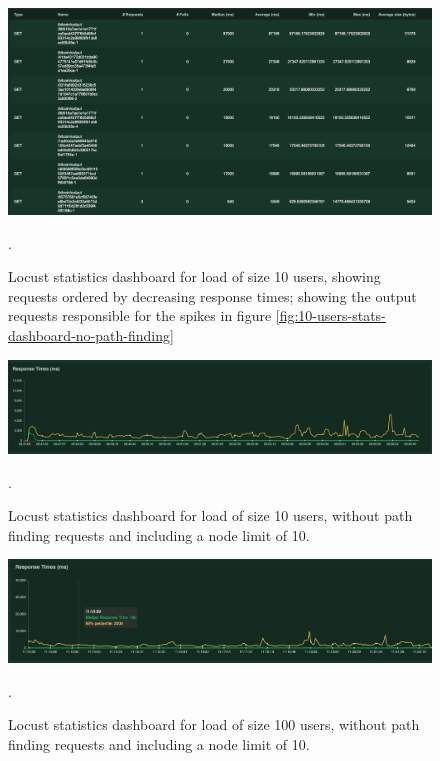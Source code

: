 \begin{appendices}
\begin{figure}[h!]
  \centering
  \includegraphics[width = 15cm]{./figures/10-users-no-path-culprit}\\[0.5cm]
  \caption{Locust statistics dashboard for load of size 10 users, showing requests ordered by decreasing response times; showing the output requests responsible for the spikes in figure \ref{fig:10-users-stats-dashboard-no-path-finding}}.
  \label{fig:10-users-slow-outputs}
\end{figure}

\begin{figure}[h!]
  \centering
  \includegraphics[width = 15cm]{./figures/10-users-no-path-with-limit}\\[0.5cm]
  \caption{Locust statistics dashboard for load of size 10 users, without path finding requests and including a node limit of 10.}.
  \label{fig:10-users-no-path-with-limit}
\end{figure}

\begin{figure}[h!]
  \centering
  \includegraphics[width = 15cm]{./figures/100-users-no-path-node-limit}\\[0.5cm]
  \caption{Locust statistics dashboard for load of size 100 users, without path finding requests and including a node limit of 10.}.
  \label{fig:100-users-no-path-with-limit}
\end{figure}



\end{appendices}